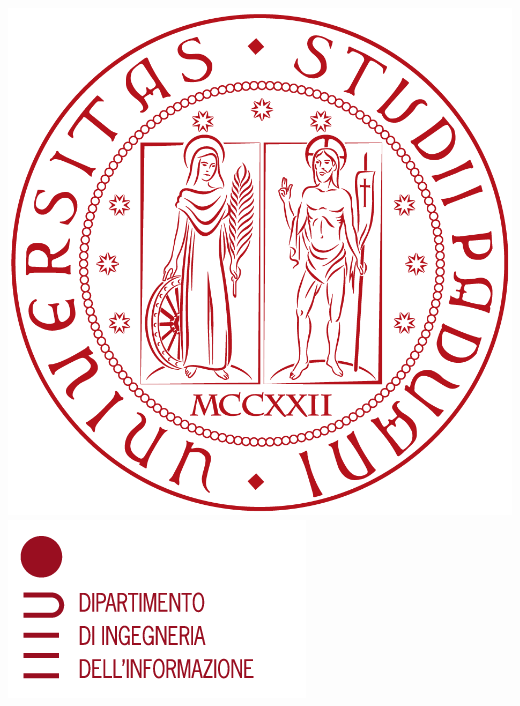 



\begin{titlepage}
\begin{center}
\includegraphics[scale=0.1]{immagini/logo.png}
\includegraphics[scale=0.98]{immagini/logo_dei.png}\\


\end{center}
\end{titlepage}
